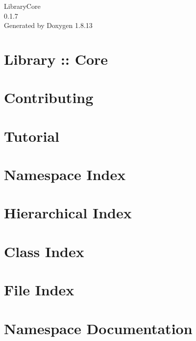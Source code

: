 \documentclass[twoside]{book}
\newcommand{\+}{\discretionary{\mbox{\scriptsize$\hookleftarrow$}}{}{}}
\newcommand{\clearemptydoublepage}{%
  \newpage{\pagestyle{empty}\cleardoublepage}%
}
\begin{document}
\hypersetup{pageanchor=false,
             bookmarksnumbered=true,
             pdfencoding=unicode
            }
\begin{titlepage}
\vspace*{7cm}
\begin{center}%
{\Large Library\+Core \\[1ex]\large 0.\+1.\+7 }\\
\vspace*{1cm}
{\large Generated by Doxygen 1.8.13}\\
\end{center}
\end{titlepage}
\clearemptydoublepage
{}
\tableofcontents
\clearemptydoublepage
{}
\hypersetup{pageanchor=true}

\chapter{Library \+:\+: Core}
\label{index}\hypertarget{index}{}
\chapter{Contributing}
\label{md__c_o_n_t_r_i_b_u_t_i_n_g}

\chapter{Tutorial}
\label{md_docs__tutorial}

\chapter{Namespace Index}

\chapter{Hierarchical Index}

\chapter{Class Index}

\chapter{File Index}

\chapter{Namespace Documentation}













\end{document}
